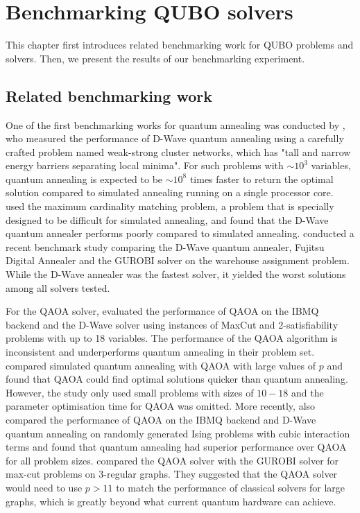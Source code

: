 \chapter{Benchmarking QUBO solvers}\label{benchmark}
This chapter first introduces related benchmarking work for QUBO problems and solvers. Then, we present the results of our benchmarking experiment.

\section{Related benchmarking work}
One of the first benchmarking works for quantum annealing was conducted by , who measured the performance of D-Wave quantum annealing using a carefully crafted problem named weak-strong cluster networks, which has "tall and narrow energy barriers separating local minima". For such problems with $\sim 10^3$ variables, quantum annealing is expected to be $\sim 10^8$ times faster to return the optimal solution compared to simulated annealing running on a single processor core.  used the maximum cardinality matching problem, a problem that is specially designed to be difficult for simulated annealing, and found that the D-Wave quantum annealer performs poorly compared to simulated annealing.  conducted a recent benchmark study comparing the D-Wave quantum annealer, Fujitsu Digital Annealer and the GUROBI solver on the warehouse assignment problem. While the D-Wave annealer was the fastest solver, it yielded the worst solutions among all solvers tested.

For the QAOA solver,  evaluated the performance of QAOA on the IBMQ backend and the D-Wave solver using instances of MaxCut and 2-satisfiability problems with up to 18 variables. The performance of the QAOA algorithm is inconsistent and underperforms quantum annealing in their problem set.  compared simulated quantum annealing with QAOA with large values of $p$ and found that QAOA could find optimal solutions quicker than quantum annealing. However, the study only used small problems with sizes of $10-18$ and the parameter optimisation time for QAOA was omitted. More recently,  also compared the performance of QAOA on the IBMQ backend and D-Wave quantum annealing on randomly generated Ising problems with cubic interaction terms and found that quantum annealing had superior performance over QAOA for all problem sizes.  compared the QAOA solver with the GUROBI solver for max-cut problems on 3-regular graphs. They suggested that the QAOA solver would need to use $p > 11$ to match the performance of classical solvers for large graphs, which is greatly beyond what current quantum hardware can achieve.

